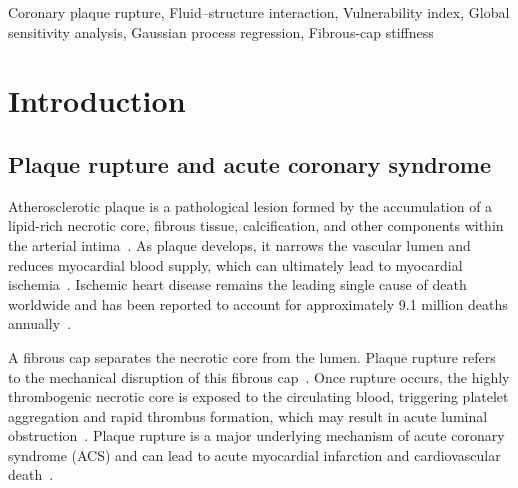 \documentclass[master,english,final]{kaist-ucs}
\begin{document}
\begin{Engkeyword}
Coronary plaque rupture, Fluid--structure interaction, Vulnerability index, Global sensitivity analysis, Gaussian process regression, Fibrous-cap stiffness
\end{Engkeyword}

\addtocounter{pagemarker}{1}
\newpage

\tableofcontents
\listoftables
\listoffigures


\chapter{Introduction}

\section{Plaque rupture and acute coronary syndrome}
Atherosclerotic plaque is a pathological lesion formed by the accumulation of a lipid-rich necrotic core, fibrous tissue, calcification, and other components within the arterial intima~\cite{bentzon2014, otsuka2016}. As plaque develops, it narrows the vascular lumen and reduces myocardial blood supply, which can ultimately lead to myocardial ischemia~\cite{bentzon2014}. Ischemic heart disease remains the leading single cause of death worldwide and has been reported to account for approximately 9.1 million deaths annually~\cite{WHO2024Top10}.

A fibrous cap separates the necrotic core from the lumen. Plaque rupture refers to the mechanical disruption of this fibrous cap~\cite{virmani2000, otsuka2016}. Once rupture occurs, the highly thrombogenic necrotic core is exposed to the circulating blood, triggering platelet aggregation and rapid thrombus formation, which may result in acute luminal obstruction~\cite{otsuka2016}. Plaque rupture is a major underlying mechanism of acute coronary syndrome (ACS) and can lead to acute myocardial infarction and cardiovascular death~\cite{lee2019, otsuka2016}.
\end{document}
